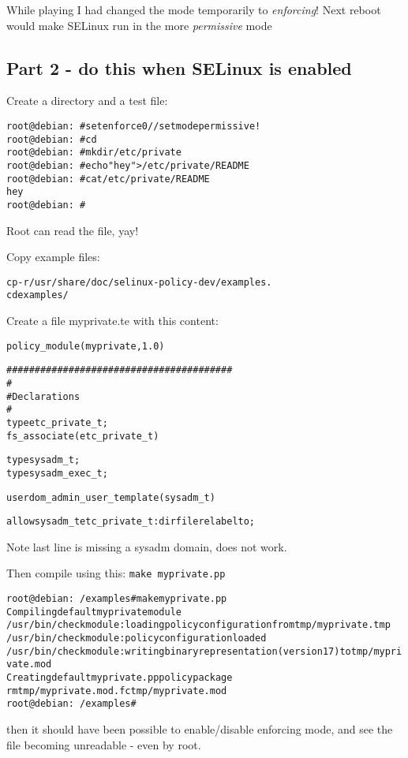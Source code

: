 \documentclass[a4paper,11pt,notitlepage]{report}
\begin{document}
While playing I had changed the mode temporarily to \emph{enforcing}! Next reboot would make SELinux run in the more \emph{permissive} mode

\subsection{Part 2 - do this when SELinux is enabled}

Create a directory and a test file:
\begin{alltt}
root@debian:~# setenforce 0   // set mode permissive!
root@debian:~# cd
root@debian:~# mkdir /etc/private
root@debian:~# echo "hey" > /etc/private/README
root@debian:~# cat /etc/private/README
hey
root@debian:~#
\end{alltt}

Root can read the file, yay!

Copy example files:
\begin{alltt}
cp -r /usr/share/doc/selinux-policy-dev/examples .
cd examples/

\end{alltt}

Create a file myprivate.te with this content:
\begin{alltt}
policy_module(myprivate, 1.0)

########################################
#
# Declarations
#
type etc_private_t;
fs_associate(etc_private_t)

type sysadm_t;
type sysadm_exec_t;

userdom_admin_user_template(sysadm_t)

allow sysadm_t etc_private_t:{dir file} relabelto;
\end{alltt}

Note last line is missing a sysadm domain, does not work.

Then compile using this: \verb+make myprivate.pp+
\begin{alltt}
root@debian:~/examples# make myprivate.pp
Compiling default myprivate module
/usr/bin/checkmodule:  loading policy configuration from tmp/myprivate.tmp
/usr/bin/checkmodule:  policy configuration loaded
/usr/bin/checkmodule:  writing binary representation (version 17) to tmp/myprivate.mod
Creating default myprivate.pp policy package
rm tmp/myprivate.mod.fc tmp/myprivate.mod
root@debian:~/examples#
\end{alltt}

then it should have been possible to enable/disable enforcing mode, and see the file becoming unreadable - even by root.
\end{document}
